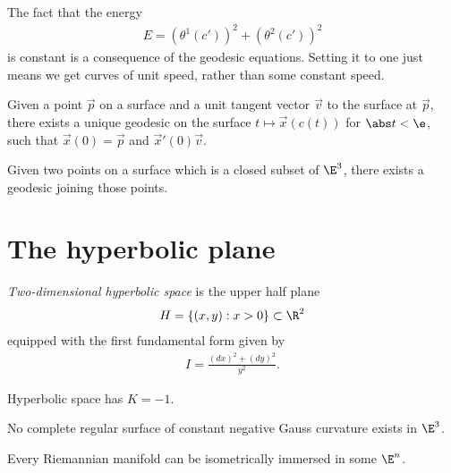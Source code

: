 \documentclass{article}
\begin{document}
\begin{proposition}[Notes 12.11]
    The fact that the energy
    \begin{align*}
        E = (\theta^1(c'))^2 + (\theta^2(c'))^2
    \end{align*}
    is constant is a consequence of the geodesic equations. Setting it to one just means we get
    curves of unit speed, rather than some constant speed.
\end{proposition}

\begin{proposition}[Notes 12.12]
    Given a point $\vec p$ on a surface and a unit tangent vector $\vec v$ to the surface at $\vec p$,
    there exists a unique geodesic on the surface $t\mapsto \vec x(c(t))$ for $\abs t < \e$,
    such that $\vec x(0) =\vec p$ and $\vec x'(0) \vec v$.
\end{proposition}

\begin{lemma}
    Given two points on a surface which is a closed subset of $\E^3$, there exists a geodesic
    joining those points.
\end{lemma}

\section{The hyperbolic plane}

\begin{definition}
    \emph{Two-dimensional hyperbolic space} is the upper half plane
    \begin{align*}
        H = \{(x,y) : x > 0\}\subset\R^2
    \end{align*}
    equipped with the first fundamental form given by
    \begin{align*}
        I = \frac{(dx)^2 + (dy)^2}{y^2}.
    \end{align*}
\end{definition}

\begin{theorem}[Notes 13.2]
    Hyperbolic space has $K=-1$.
\end{theorem}

\begin{theorem}[Hilbert]
    No complete regular surface of constant negative Gauss curvature exists in $\E^3$.
\end{theorem}

\begin{theorem}[Nash]
    Every Riemannian manifold can be isometrically immersed in some $\E^n$.
\end{theorem}
\end{document}
